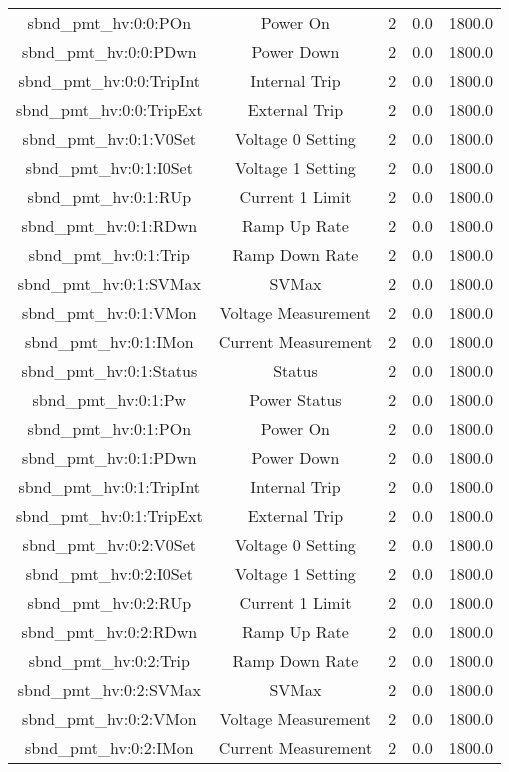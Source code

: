 \begin{center}
\begin{longtable}{c | c c c c }
sbnd\_pmt\_hv:0:0:POn & Power On & 2 & 0.0 & 1800.0\\ 
sbnd\_pmt\_hv:0:0:PDwn & Power Down & 2 & 0.0 & 1800.0\\ 
sbnd\_pmt\_hv:0:0:TripInt & Internal Trip & 2 & 0.0 & 1800.0\\ 
sbnd\_pmt\_hv:0:0:TripExt & External Trip & 2 & 0.0 & 1800.0\\ 
sbnd\_pmt\_hv:0:1:V0Set & Voltage 0 Setting & 2 & 0.0 & 1800.0\\ 
sbnd\_pmt\_hv:0:1:I0Set & Voltage 1 Setting & 2 & 0.0 & 1800.0\\ 
sbnd\_pmt\_hv:0:1:RUp & Current 1 Limit & 2 & 0.0 & 1800.0\\ 
sbnd\_pmt\_hv:0:1:RDwn & Ramp Up Rate & 2 & 0.0 & 1800.0\\ 
sbnd\_pmt\_hv:0:1:Trip & Ramp Down Rate & 2 & 0.0 & 1800.0\\ 
sbnd\_pmt\_hv:0:1:SVMax & SVMax & 2 & 0.0 & 1800.0\\ 
sbnd\_pmt\_hv:0:1:VMon & Voltage Measurement & 2 & 0.0 & 1800.0\\ 
sbnd\_pmt\_hv:0:1:IMon & Current Measurement & 2 & 0.0 & 1800.0\\ 
sbnd\_pmt\_hv:0:1:Status & Status & 2 & 0.0 & 1800.0\\ 
sbnd\_pmt\_hv:0:1:Pw & Power Status & 2 & 0.0 & 1800.0\\ 
sbnd\_pmt\_hv:0:1:POn & Power On & 2 & 0.0 & 1800.0\\ 
sbnd\_pmt\_hv:0:1:PDwn & Power Down & 2 & 0.0 & 1800.0\\ 
sbnd\_pmt\_hv:0:1:TripInt & Internal Trip & 2 & 0.0 & 1800.0\\ 
sbnd\_pmt\_hv:0:1:TripExt & External Trip & 2 & 0.0 & 1800.0\\ 
sbnd\_pmt\_hv:0:2:V0Set & Voltage 0 Setting & 2 & 0.0 & 1800.0\\ 
sbnd\_pmt\_hv:0:2:I0Set & Voltage 1 Setting & 2 & 0.0 & 1800.0\\ 
sbnd\_pmt\_hv:0:2:RUp & Current 1 Limit & 2 & 0.0 & 1800.0\\ 
sbnd\_pmt\_hv:0:2:RDwn & Ramp Up Rate & 2 & 0.0 & 1800.0\\ 
sbnd\_pmt\_hv:0:2:Trip & Ramp Down Rate & 2 & 0.0 & 1800.0\\ 
sbnd\_pmt\_hv:0:2:SVMax & SVMax & 2 & 0.0 & 1800.0\\ 
sbnd\_pmt\_hv:0:2:VMon & Voltage Measurement & 2 & 0.0 & 1800.0\\ 
sbnd\_pmt\_hv:0:2:IMon & Current Measurement & 2 & 0.0 & 1800.0\\ 

\end{longtable}
\end{center}
